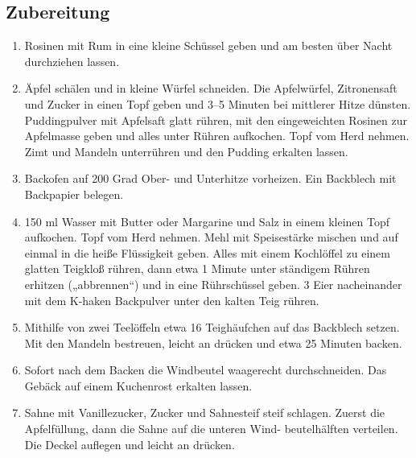 \subsection*{Zubereitung}
\begin{enumerate}
    \item Rosinen mit Rum in eine kleine Schüssel geben und am besten über Nacht durchziehen lassen.
    \item Äpfel schälen und in kleine Würfel schneiden. Die Apfelwürfel, Zitronensaft und Zucker in einen Topf geben und 3–5 Minuten bei mittlerer Hitze dünsten. Puddingpulver mit Apfelsaft glatt rühren, mit den eingeweichten Rosinen     zur Apfelmasse geben und alles unter Rühren aufkochen. Topf vom Herd nehmen. Zimt und Mandeln unterrühren und den Pudding erkalten lassen.
    \item Backofen auf 200 Grad Ober- und Unterhitze vorheizen. Ein Backblech mit Backpapier belegen.
    \item 150 ml Wasser mit Butter oder Margarine und Salz in einem kleinen Topf aufkochen. Topf vom Herd nehmen. Mehl mit Speisestärke mischen und auf einmal in die heiße Flüssigkeit geben. Alles mit einem Kochlöffel zu einem glatten Teigkloß rühren, dann etwa 1 Minute unter ständigem Rühren erhitzen („abbrennen“) und in eine Rührschüssel geben. 3 Eier nacheinander mit dem K-haken Backpulver unter den kalten Teig rühren.
    \item Mithilfe von zwei Teelöffeln etwa 16 Teighäufchen auf das Backblech setzen. Mit den Mandeln bestreuen, leicht an drücken und etwa 25 Minuten backen.
    \item Sofort nach dem Backen die Windbeutel waagerecht durchschneiden. Das Gebäck auf einem Kuchenrost erkalten lassen.
    \item Sahne mit Vanillezucker, Zucker und Sahnesteif steif schlagen. Zuerst die Apfelfüllung, dann die Sahne auf die unteren Wind-
    beutelhälften verteilen. Die Deckel auflegen und leicht an drücken. 
\end{enumerate}
